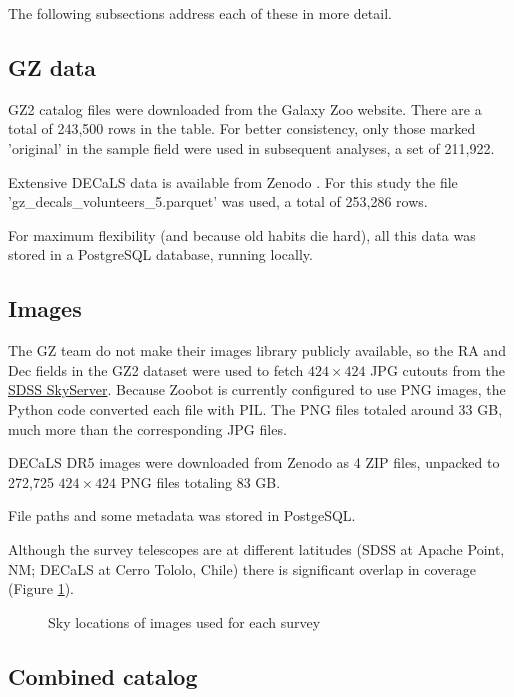\documentclass[preprint]{aastex631}
\begin{document}
The following subsections address each of these in more detail.

\subsection{GZ data}

GZ2 catalog files were downloaded from the Galaxy Zoo website.
There are a total of 243,500 rows in the table. For better consistency, only those marked 'original' in the sample field were used in subsequent analyses, a set of 211,922.

Extensive DECaLS data is available from Zenodo \citep{walmsley_mike_2020_4573248}. For this study the file 'gz\_decals\_volunteers\_5.parquet' was used, a total of 253,286 rows.

For maximum flexibility (and because old habits die hard), all this data was stored in a PostgreSQL database, running locally.

\subsection{Images} \label{images}

The GZ team do not make their images library publicly available, so the RA and Dec fields in the GZ2 dataset were used to fetch $424 \times 424$ JPG cutouts from the \href{http://skyserver.sdss.org/dr14/SkyServerWS/ImgCutout/getjpeg}{SDSS SkyServer}. Because Zoobot is currently configured to use PNG images, the Python code converted each file with PIL. The PNG files totaled around 33 GB, much more than the corresponding JPG files.

DECaLS DR5 images were downloaded from Zenodo \citep{walmsley_mike_2020_4573248} as 4 ZIP files, unpacked to 272,725 $424 \times 424$ PNG files totaling 83 GB. 

File paths and some metadata was stored in PostgeSQL.

Although the survey telescopes are at different latitudes (SDSS at Apache Point, NM; DECaLS at Cerro Tololo, Chile) there is significant overlap in coverage (Figure \ref{fig:coverage}).

\begin{figure}[htb!]
	\caption{Sky locations of images used for each survey
		\label{fig:coverage}}
\end{figure}



\subsection{Combined catalog}
\end{document}
